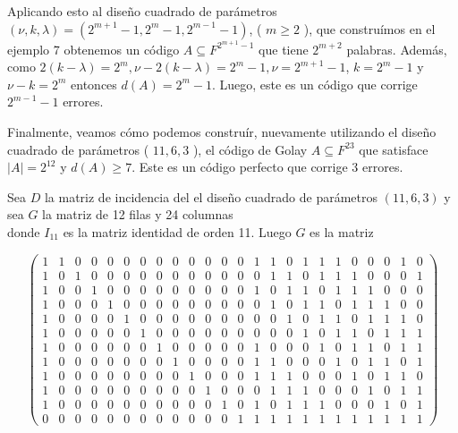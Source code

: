 \documentclass[10pt]{article}
\begin{document}
Aplicando esto al diseño cuadrado de parámetros $(\nu, k, \lambda)=\left(2^{m+1}-1,2^{m}-1,2^{m-1}-1\right)$, ( $m \geq 2$ ), que construímos en el ejemplo 7 obtenemos un código $A \subseteq F^{2^{m+1}-1}$ que tiene $2^{m+2}$ palabras. Además, como $2(k-\lambda)=2^{m}, \nu-2(k-\lambda)=2^{m}-1, \nu=2^{m+1}-1$, $k=2^{m}-1$ y $\nu-k=2^{m}$ entonces $d(A)=2^{m}-1$. Luego, este es un código que corrige $2^{m-1}-1$ errores.

Finalmente, veamos cómo podemos construír, nuevamente utilizando el diseño cuadrado de parámetros ( $11,6,3$ ), el código de Golay $A \subseteq F^{23}$ que satisface $|A|=2^{12}$ y $d(A) \geq 7$. Este es un código perfecto que corrige 3 errores.

Sea $D$ la matriz de incidencia del el diseño cuadrado de parámetros $(11,6,3)$ y sea $G$ la matriz de 12 filas y 24 columnas\\
donde $I_{11}$ es la matriz identidad de orden 11. Luego $G$ es la matriz

$$
\left(\begin{array}{llllllllllllllllllllllll}
1 & 1 & 0 & 0 & 0 & 0 & 0 & 0 & 0 & 0 & 0 & 0 & 0 & 1 & 1 & 0 & 1 & 1 & 1 & 0 & 0 & 0 & 1 & 0 \\
1 & 0 & 1 & 0 & 0 & 0 & 0 & 0 & 0 & 0 & 0 & 0 & 0 & 0 & 1 & 1 & 0 & 1 & 1 & 1 & 0 & 0 & 0 & 1 \\
1 & 0 & 0 & 1 & 0 & 0 & 0 & 0 & 0 & 0 & 0 & 0 & 0 & 1 & 0 & 1 & 1 & 0 & 1 & 1 & 1 & 0 & 0 & 0 \\
1 & 0 & 0 & 0 & 1 & 0 & 0 & 0 & 0 & 0 & 0 & 0 & 0 & 0 & 1 & 0 & 1 & 1 & 0 & 1 & 1 & 1 & 0 & 0 \\
1 & 0 & 0 & 0 & 0 & 1 & 0 & 0 & 0 & 0 & 0 & 0 & 0 & 0 & 0 & 1 & 0 & 1 & 1 & 0 & 1 & 1 & 1 & 0 \\
1 & 0 & 0 & 0 & 0 & 0 & 1 & 0 & 0 & 0 & 0 & 0 & 0 & 0 & 0 & 0 & 1 & 0 & 1 & 1 & 0 & 1 & 1 & 1 \\
1 & 0 & 0 & 0 & 0 & 0 & 0 & 1 & 0 & 0 & 0 & 0 & 0 & 1 & 0 & 0 & 0 & 1 & 0 & 1 & 1 & 0 & 1 & 1 \\
1 & 0 & 0 & 0 & 0 & 0 & 0 & 0 & 1 & 0 & 0 & 0 & 0 & 1 & 1 & 0 & 0 & 0 & 1 & 0 & 1 & 1 & 0 & 1 \\
1 & 0 & 0 & 0 & 0 & 0 & 0 & 0 & 0 & 1 & 0 & 0 & 0 & 1 & 1 & 1 & 0 & 0 & 0 & 1 & 0 & 1 & 1 & 0 \\
1 & 0 & 0 & 0 & 0 & 0 & 0 & 0 & 0 & 0 & 1 & 0 & 0 & 0 & 1 & 1 & 1 & 0 & 0 & 0 & 1 & 0 & 1 & 1 \\
1 & 0 & 0 & 0 & 0 & 0 & 0 & 0 & 0 & 0 & 0 & 1 & 0 & 1 & 0 & 1 & 1 & 1 & 0 & 0 & 0 & 1 & 0 & 1 \\
0 & 0 & 0 & 0 & 0 & 0 & 0 & 0 & 0 & 0 & 0 & 0 & 1 & 1 & 1 & 1 & 1 & 1 & 1 & 1 & 1 & 1 & 1 & 1
\end{array}\right)
$$
\end{document}
